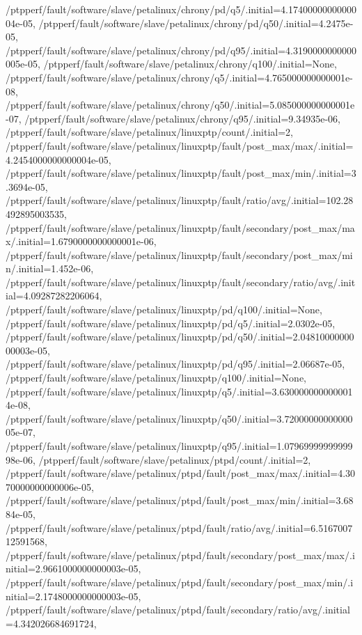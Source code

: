 {    /ptpperf/fault/software/slave/petalinux/chrony/pd/q5/.initial=4.1740000000000004e-05,
    /ptpperf/fault/software/slave/petalinux/chrony/pd/q50/.initial=4.2475e-05,
    /ptpperf/fault/software/slave/petalinux/chrony/pd/q95/.initial=4.3190000000000005e-05,
    /ptpperf/fault/software/slave/petalinux/chrony/q100/.initial=None,
    /ptpperf/fault/software/slave/petalinux/chrony/q5/.initial=4.765000000000001e-08,
    /ptpperf/fault/software/slave/petalinux/chrony/q50/.initial=5.085000000000001e-07,
    /ptpperf/fault/software/slave/petalinux/chrony/q95/.initial=9.34935e-06,
    /ptpperf/fault/software/slave/petalinux/linuxptp/count/.initial=2,
    /ptpperf/fault/software/slave/petalinux/linuxptp/fault/post_max/max/.initial=4.2454000000000004e-05,
    /ptpperf/fault/software/slave/petalinux/linuxptp/fault/post_max/min/.initial=3.3694e-05,
    /ptpperf/fault/software/slave/petalinux/linuxptp/fault/ratio/avg/.initial=102.28492895003535,
    /ptpperf/fault/software/slave/petalinux/linuxptp/fault/secondary/post_max/max/.initial=1.6790000000000001e-06,
    /ptpperf/fault/software/slave/petalinux/linuxptp/fault/secondary/post_max/min/.initial=1.452e-06,
    /ptpperf/fault/software/slave/petalinux/linuxptp/fault/secondary/ratio/avg/.initial=4.09287282206064,
    /ptpperf/fault/software/slave/petalinux/linuxptp/pd/q100/.initial=None,
    /ptpperf/fault/software/slave/petalinux/linuxptp/pd/q5/.initial=2.0302e-05,
    /ptpperf/fault/software/slave/petalinux/linuxptp/pd/q50/.initial=2.0481000000000003e-05,
    /ptpperf/fault/software/slave/petalinux/linuxptp/pd/q95/.initial=2.06687e-05,
    /ptpperf/fault/software/slave/petalinux/linuxptp/q100/.initial=None,
    /ptpperf/fault/software/slave/petalinux/linuxptp/q5/.initial=3.6300000000000014e-08,
    /ptpperf/fault/software/slave/petalinux/linuxptp/q50/.initial=3.7200000000000005e-07,
    /ptpperf/fault/software/slave/petalinux/linuxptp/q95/.initial=1.0796999999999998e-06,
    /ptpperf/fault/software/slave/petalinux/ptpd/count/.initial=2,
    /ptpperf/fault/software/slave/petalinux/ptpd/fault/post_max/max/.initial=4.3070000000000006e-05,
    /ptpperf/fault/software/slave/petalinux/ptpd/fault/post_max/min/.initial=3.6884e-05,
    /ptpperf/fault/software/slave/petalinux/ptpd/fault/ratio/avg/.initial=6.516700712591568,
    /ptpperf/fault/software/slave/petalinux/ptpd/fault/secondary/post_max/max/.initial=2.9661000000000003e-05,
    /ptpperf/fault/software/slave/petalinux/ptpd/fault/secondary/post_max/min/.initial=2.1748000000000003e-05,
    /ptpperf/fault/software/slave/petalinux/ptpd/fault/secondary/ratio/avg/.initial=4.342026684691724,
}
